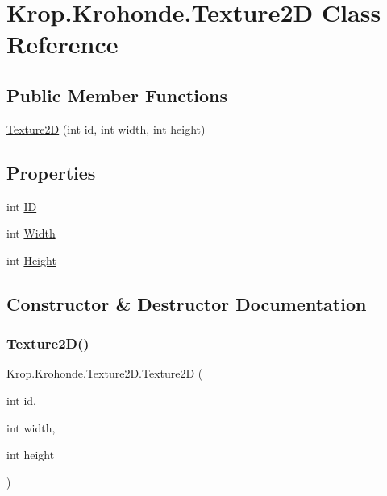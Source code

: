 \hypertarget{class_krop_1_1_krohonde_1_1_texture2_d}{}\section{Krop.\+Krohonde.\+Texture2D Class Reference}
\label{class_krop_1_1_krohonde_1_1_texture2_d}
\subsection*{Public Member Functions}
\begin{DoxyCompactItemize}
\item 
\mbox{\hyperlink{class_krop_1_1_krohonde_1_1_texture2_d_a9558de84975b10d522dff486aca06343}{Texture2D}} (int id, int width, int height)
\end{DoxyCompactItemize}
\subsection*{Properties}
\begin{DoxyCompactItemize}
\item 
int \mbox{\hyperlink{class_krop_1_1_krohonde_1_1_texture2_d_aa5b329a7dc50ebb6193cc0d63b205631}{ID}}
\item 
int \mbox{\hyperlink{class_krop_1_1_krohonde_1_1_texture2_d_adac0dafaf47b7ed77eb6fc9bf43972d6}{Width}}
\item 
int \mbox{\hyperlink{class_krop_1_1_krohonde_1_1_texture2_d_a1ee6a5a7735251a27cb865ab805c8571}{Height}}
\end{DoxyCompactItemize}


\subsection{Constructor \& Destructor Documentation}
\mbox{\label{class_krop_1_1_krohonde_1_1_texture2_d_a9558de84975b10d522dff486aca06343}} 
\subsubsection{\texorpdfstring{Texture2\+D()}{Texture2D()}}
{\footnotesize\ttfamily Krop.\+Krohonde.\+Texture2\+D.\+Texture2D (\begin{DoxyParamCaption}\item[{int}]{id,  }\item[{int}]{width,  }\item[{int}]{height }\end{DoxyParamCaption})}



